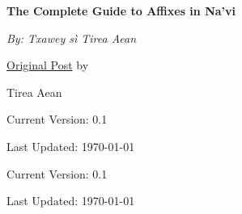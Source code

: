 \documentclass[12pt,a4paper,titlepage, dvipsnames]{book}
\begin{document}
\begin{titlepage}
	\centering
	\vspace*{3.5cm}
	\vspace*{1.5cm}

	{\huge\bfseries The Complete Guide to Affixes in Na'vi\par}
	\vspace{2cm}
	{\Large\itshape By: Txawey sì Tirea Aean\par}
	\vfill
	\href{https://forum.learnnavi.org/prefixes-infixes-and-suffixes/easy-guide-to-navi-prefixes-infixes-and-suffixes-ii/}{Original Post} by\par
	Tirea Aean 

	\vspace{2cm}
\scriptsize Current Version: 0.1\par
\scriptsize Last Updated: \today\par
	\vfill
\scriptsize Current Version: 0.1\par
\scriptsize Last Updated: \today\par
\end{titlepage}
\tableofcontents

\clearpage





\end{document}
